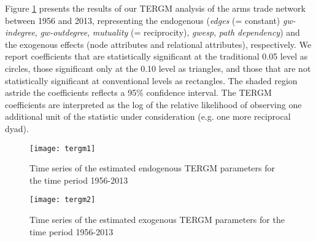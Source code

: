 \documentclass[12pt, letterpaper]{article}
\numberwithin{equation}{section}
\begin{document}
Figure \ref{tergm1} presents the results of our TERGM analysis of the arms trade network between 1956 and 2013, representing the endogenous (\textit{edges} (= constant) \textit{gw-indegree}, \textit{gw-outdegree}, \textit{mutuality} (= reciprocity), \textit{gwesp}, \textit{path dependency}) and the exogenous effects (node attributes and relational attributes), respectively. 
We report coefficients that are statistically significant at the traditional 0.05 level as circles, those significant only at the 0.10 level as triangles, and those that are not statistically significant at conventional levels as rectangles. 
The shaded region astride the coefficients reflects a 95\% confidence interval. 
The TERGM coefficients are interpreted as the log of the relative likelihood of observing one additional unit of the statistic under consideration (e.g. one more reciprocal dyad). 


\begin{figure}
\vspace{-3cm} 
 \begin{adjustwidth}{-2cm}{}
\begin{center}
\texttt{[image: tergm1]}
\caption{Time series of the estimated endogenous TERGM parameters for the time period 1956-2013}
\label{tergm1}
\end{center}
 \end{adjustwidth}
\end{figure}
\renewcommand{\thefigure}{\arabic{figure} (Cont.)}
\addtocounter{figure}{-1}
\begin{figure}
\vspace{-3cm} 
 \begin{adjustwidth}{-2cm}{}
\begin{center}
\texttt{[image: tergm2]}
\caption{Time series of the estimated exogenous TERGM parameters for the time period 1956-2013 }
\label{tergm2}
\end{center}
 \end{adjustwidth}
\end{figure} 
\end{document}
